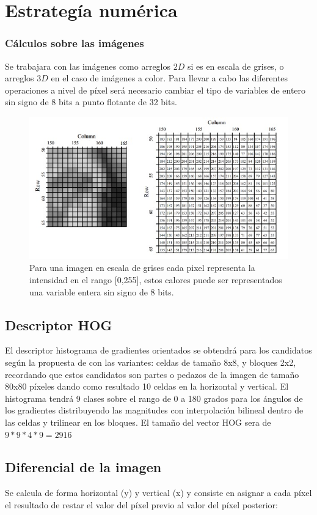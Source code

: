 \documentclass{article}
\begin{document}
\section*{Estrategía numérica}
\subsubsection*{Cálculos sobre las imágenes}
Se trabajara con las imágenes como arreglos \(2D\) si es en escala de grises, o arreglos \(3D\) en el caso de imágenes a color. Para llevar a cabo las diferentes operaciones a nivel de píxel será necesario cambiar el tipo de variables de entero sin signo de 8 bits a punto flotante de 32 bits.

\begin{figure}[ht]
\centering
\includegraphics[width=.75\textwidth]{imagen-matriz.jpg}
\caption{Para una imagen en escala de grises  cada pixel representa la intensidad en el rango [0,255], estos calores puede ser representados una variable entera sin signo de 8 bits. }
\label{fig:imagen-matriz}
\end{figure}


\subsection*{Descriptor HOG}
El descriptor  histograma de gradientes orientados se obtendrá para los candidatos según la propuesta de \cite{dalal-triggs} con las variantes: celdas de tamaño 8x8, y  bloques 2x2,    recordando que estos candidatos son partes o pedazos de la imagen de tamaño 80x80 píxeles dando como resultado 10 celdas en la horizontal y vertical. El histograma tendrá 9 clases sobre el rango de 0 a 180 grados para los ángulos de los gradientes distribuyendo las magnitudes con interpolación bilineal dentro de las celdas y trilinear en los bloques. El tamaño del vector HOG sera de \(9 * 9 * 4 * 9 = 2916\)

\subsection*{Diferencial de la imagen}
Se calcula de forma horizontal (y) y vertical (x) y consiste en asignar a cada píxel el resultado de restar el valor del píxel previo al valor del píxel posterior:
\end{document}
